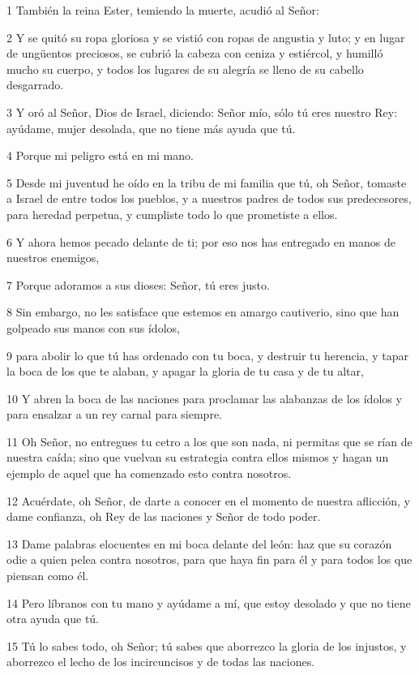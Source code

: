 \par 1 También la reina Ester, temiendo la muerte, acudió al Señor:
\par 2 Y se quitó su ropa gloriosa y se vistió con ropas de angustia y luto; y en lugar de ungüentos preciosos, se cubrió la cabeza con ceniza y estiércol, y humilló mucho su cuerpo, y todos los lugares de su alegría se lleno de su cabello desgarrado.
\par 3 Y oró al Señor, Dios de Israel, diciendo: Señor mío, sólo tú eres nuestro Rey: ayúdame, mujer desolada, que no tiene más ayuda que tú.
\par 4 Porque mi peligro está en mi mano.
\par 5 Desde mi juventud he oído en la tribu de mi familia que tú, oh Señor, tomaste a Israel de entre todos los pueblos, y a nuestros padres de todos sus predecesores, para heredad perpetua, y cumpliste todo lo que prometiste a ellos.
\par 6 Y ahora hemos pecado delante de ti; por eso nos has entregado en manos de nuestros enemigos,
\par 7 Porque adoramos a sus dioses: Señor, tú eres justo.
\par 8 Sin embargo, no les satisface que estemos en amargo cautiverio, sino que han golpeado sus manos con sus ídolos,
\par 9 para abolir lo que tú has ordenado con tu boca, y destruir tu herencia, y tapar la boca de los que te alaban, y apagar la gloria de tu casa y de tu altar,
\par 10 Y abren la boca de las naciones para proclamar las alabanzas de los ídolos y para ensalzar a un rey carnal para siempre.
\par 11 Oh Señor, no entregues tu cetro a los que son nada, ni permitas que se rían de nuestra caída; sino que vuelvan su estrategia contra ellos mismos y hagan un ejemplo de aquel que ha comenzado esto contra nosotros.
\par 12 Acuérdate, oh Señor, de darte a conocer en el momento de nuestra aflicción, y dame confianza, oh Rey de las naciones y Señor de todo poder.
\par 13 Dame palabras elocuentes en mi boca delante del león: haz que su corazón odie a quien pelea contra nosotros, para que haya fin para él y para todos los que piensan como él.
\par 14 Pero líbranos con tu mano y ayúdame a mí, que estoy desolado y que no tiene otra ayuda que tú.
\par 15 Tú lo sabes todo, oh Señor; tú sabes que aborrezco la gloria de los injustos, y aborrezco el lecho de los incircuncisos y de todas las naciones.
